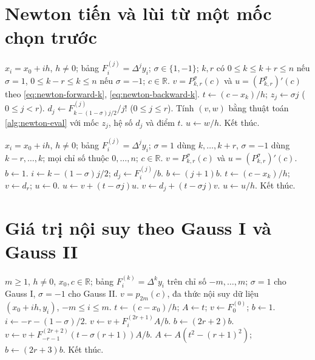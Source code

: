 \documentclass[12pt,a4paper,oneside]{book}
\numberwithin{algorithm}{chapter}
\theoremstyle{definition}
\newcommand{\R}{\mathbb{R}}
\begin{document}
\section{Newton tiến và lùi từ một mốc chọn trước}
\begin{algorithm}[H]
\caption{Giá trị và đạo hàm từ $x_k$: sơ lược}
\label{alg:newton-from-k-short}
\begin{algorithmic}[1]
\Require $x_i=x_0+ih$, $h\ne0$; bảng $F_i^{(j)}=\Delta^jy_i$; $\sigma\in\{1,-1\}$; $k,r$ có $0\leq k\leq k+r\leq n$ nếu $\sigma=1$, $0\leq k-r\leq k\leq n$ nếu $\sigma=-1$; $c\in\R$.
\Ensure $v=P_{k,r}^{\sigma}(c)$ và $u=(P_{k,r}^{\sigma})'(c)$ theo \eqref{eq:newton-forward-k}, \eqref{eq:newton-backward-k}.
\State $t\gets(c-x_k)/h$; $z_j\gets\sigma j$ ($0\leq j<r$).
\State $d_j\gets F_{k-(1-\sigma)j/2}^{(j)}/j!$ ($0\leq j\leq r$).
\State Tính $(v,w)$ bằng thuật toán \ref{alg:newton-eval} với mốc $z_j$, hệ số $d_j$ và điểm $t$.
\State $u\gets w/h$.
\State Kết thúc.
\end{algorithmic}
\end{algorithm}
\begin{algorithm}[H]
\caption{Giá trị và đạo hàm từ $x_k$: chi tiết}
\label{alg:newton-from-k}
\begin{algorithmic}[1]
\Require $x_i=x_0+ih$, $h\ne0$; bảng $F_i^{(j)}=\Delta^jy_i$; $\sigma=1$ dùng $k,\ldots,k+r$, $\sigma=-1$ dùng $k-r,\ldots,k$; mọi chỉ số thuộc $0,\ldots,n$; $c\in\R$.
\Ensure $v=P_{k,r}^{\sigma}(c)$ và $u=(P_{k,r}^{\sigma})'(c)$.
\State $b\gets1$.
 \State $i\gets k-(1-\sigma)j/2$; $d_j\gets F_i^{(j)}/b$.
 \State $b\gets(j+1)b$.
\EndFor
\Statex
\State $t\gets(c-x_k)/h$; $v\gets d_r$; $u\gets0$.
 \State $u\gets v+(t-\sigma j)u$.
 \State $v\gets d_j+(t-\sigma j)v$.
\EndFor
\Statex
\State $u\gets u/h$.
\State Kết thúc.
\end{algorithmic}
\end{algorithm}

\section{Giá trị nội suy theo Gauss I và Gauss II}
\begin{algorithm}[H]
\caption{Tính giá trị theo công thức Gauss}
\label{alg:central-gauss}
\begin{algorithmic}[1]
\Require $m\geq1$, $h\ne0$, $x_0,c\in\R$; bảng $F_i^{(k)}=\Delta^ky_i$ trên chỉ số $-m,\ldots,m$; $\sigma=1$ cho Gauss I, $\sigma=-1$ cho Gauss II.
\Ensure $v=p_{2m}(c)$, đa thức nội suy dữ liệu $(x_0+ih,y_i)$, $-m\leq i\leq m$.
\State $t\gets(c-x_0)/h$; $A\gets t$; $v\gets F_0^{(0)}$; $b\gets1$.
 \State $i\gets-r-(1-\sigma)/2$.
 \State $v\gets v+F_i^{(2r+1)}A/b$.
 \State $b\gets(2r+2)b$.
 \State $v\gets v+F_{-r-1}^{(2r+2)}(t-\sigma(r+1))A/b$.
 \State $A\gets A(t^2-(r+1)^2)$; $b\gets(2r+3)b$.
\EndFor
\Statex
\State Kết thúc.
\end{algorithmic}
\end{algorithm}
\end{document}
